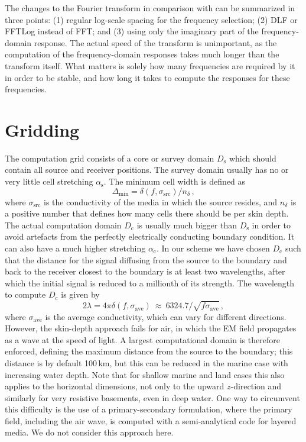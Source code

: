 \documentclass[
    manuscript,
    revised,
  ]{geophysics}
\newcommand{\mr}[1]{\mathrm{#1}}
\begin{document}
The changes to the Fourier transform in comparison with \cite{GEO.08.Mulder}
can be summarized in three points: (1) regular log-scale spacing for the
frequency selection; (2) DLF or FFTLog instead of FFT; and (3) using only the
imaginary part of the frequency-domain response. The actual speed of the
transform is unimportant, as the computation of the frequency-domain responses
takes much longer than the transform itself. What matters is solely how many
frequencies are required by it in order to be stable, and how long it takes to
compute the responses for these frequencies.

\section{Gridding}

The computation grid consists of a core or survey domain $D_\mr{s}$ which
should contain all source and receiver positions. The survey domain usually has
no or very little cell stretching $\alpha_\mr{s}$. The minimum cell width is
defined as
%
\begin{equation}
  \Delta_\mr{min}=\delta(f, \sigma_\mr{src})/n_\delta \, ,
  \label{eq:minwidth}
\end{equation}
%
where $\sigma_\mr{src}$ is the conductivity of the media in which the source
resides, and $n_\delta$ is a positive number that defines how many cells there
should be per skin depth. The actual computation domain $D_\mr{c}$ is usually
much bigger than $D_\mr{s}$ in order to avoid artefacts from the perfectly
electrically conducting boundary condition. It can also have a much higher
stretching $\alpha_\mr{c}$. In our scheme we have chosen $D_\mr{c}$ such that
the distance for the signal diffusing from the source to the boundary and back
to the receiver closest to the boundary is at least two wavelengths, after
which the initial signal is reduced to a millionth of its strength. The
wavelength to compute $D_\mr{c}$ is given by
%
\begin{equation}
  2\lambda = 4\pi\delta(f, \sigma_\mr{ave})
  \ \approx \ 6324.7/\sqrt{f\sigma_\mr{ave}}\, ,
 \label{eq:lambda}
\end{equation}
%
where $\sigma_\mr{ave}$ is the average conductivity, which can vary for
different directions. However, the skin-depth approach fails for air, in which
the EM field propagates as a wave at the speed of light. A largest
computational domain is therefore enforced, defining the maximum distance from
the source to the boundary; this distance is by default 100\,km, but this can
be reduced in the marine case with increasing water depth. Note that for
shallow marine and land cases this also applies to the horizontal dimensions,
not only to the upward $z$-direction and similarly for very resistive
basements, even in deep water. One way to circumvent this difficulty is the use
of a primary-secondary formulation, where the primary field, including the air
wave, is computed with a semi-analytical code for layered media. We do not
consider this approach here.
\end{document}
